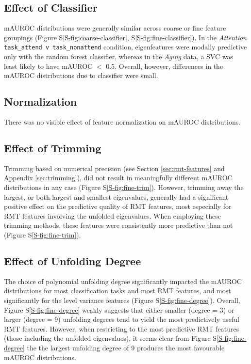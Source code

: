 \documentclass[12pt]{spieman}  %
\newcommand{\code}[1]{\small\texttt{#1}\normalsize}
\begin{document}
\begin{spacing}{2}
\subsection{Effect of Classifier}
mAUROC distributions were generally similar across coarse or fine feature
groupings (Figure S\ref{S-fig:coarse-classifier}, S\ref{S-fig:fine-classifier}).
In the \textit{Attention} \code{task\_attend v task\_nonattend} condition, eigenfeatures were modally predictive only with
the random forest classifier, whereas in the \textit{Aging} data, a SVC was least
likely to have mAUROC \(<\) 0.5. Overall, however, differences in the mAUROC distributions
due to classifier were small.

\subsection{Normalization}
There was no visible effect of feature normalization on mAUROC distributions.


\subsection{Effect of Trimming}
Trimming based on numerical precision (see Section \ref{sec:rmt-features} and
Appendix \ref{sec:trimming}), did not result in meaningfully different mAUROC
distributions in any case (Figure S\ref{S-fig:fine-trim}). However, trimming
away the largest, or both largest and smallest eigenvalues, generally had a
significant positive effect on the predictive quality of RMT features, most
especially for RMT features involving the unfolded eigenvalues. When employing
these trimming methods, these features were consistently more predictive than
not (Figure S\ref{S-fig:fine-trim}).

\subsection{Effect of Unfolding Degree}
The choice of polynomial unfolding degree significantly impacted the mAUROC
distributions for most classification tasks and most RMT features, and most
significantly for the level variance features (Figure
S\ref{S-fig:fine-degree}). Overall, Figure S\ref{S-fig:fine-degree} weakly
suggests that either smaller (degree = 3) or larger (degree = 9) unfolding
degrees tend to yield the most predictively useful RMT features. However, when
restricting to the most predictive RMT features (those including the unfolded
eigenvalues), it seems clear from Figure S\ref{S-fig:fine-degree} the the
largest unfolding degree of 9 produces the most favourable mAUROC
distributions.


\end{spacing}
\end{document}
